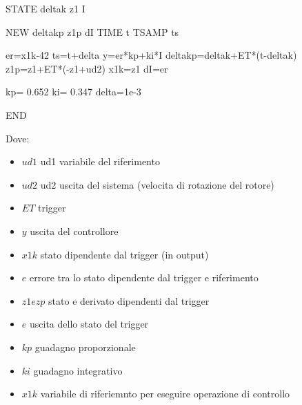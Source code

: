 \documentclass[a4paper,13pt]{article}
\begin{document}
STATE deltak z1 I

NEW  deltakp z1p dI
TIME t
TSAMP ts

er=x1k-42
ts=t+delta
y=er*kp+ki*I
deltakp=deltak+ET*(t-deltak)
z1p=z1+ET*(-z1+ud2)
x1k=z1
dI=er

kp= 0.652 
ki= 0.347 
delta=1e-3

END

Dove:
\begin{itemize}
\item $ud1$     ud1 variabile del riferimento
\item $ud2$     ud2 uscita del sistema (velocita di rotazione del rotore)
\item $ET$      trigger 
\item $y$       uscita del controllore
\item $x1k$     stato dipendente dal trigger (in output)
\item $e$       errore tra lo stato dipendente dal trigger e riferimento
\item $z1 e zp$ stato e derivato dipendenti dal trigger
\item $e$       uscita dello stato del trigger
\item $kp$      guadagno proporzionale
\item $ki$      guadagno integrativo
\item $x1k$     variabile di riferiemnto per eseguire operazione di controllo 
\end{itemize}
\end{document}

